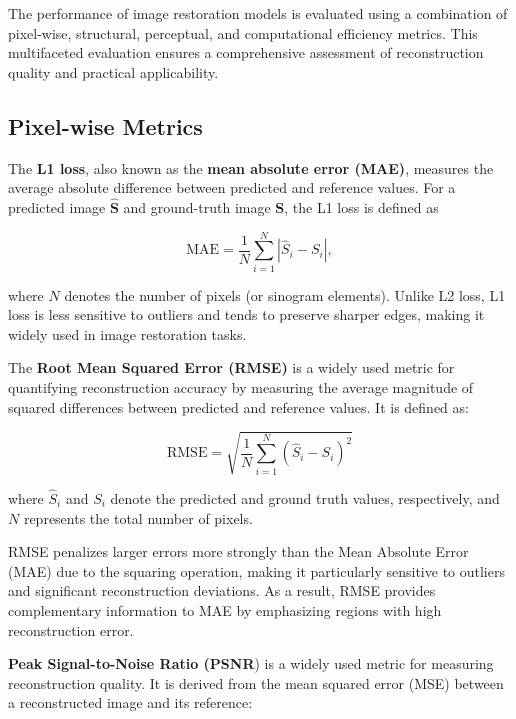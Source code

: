 The performance of image restoration models is evaluated using a combination of pixel-wise, structural, perceptual, and computational efficiency metrics. This multifaceted evaluation ensures a comprehensive assessment of reconstruction quality and practical applicability.

\subsection{Pixel-wise Metrics}

The\textbf{ L1 loss}, also known as the \textbf{mean absolute error (MAE)}, measures the average absolute difference between predicted and reference values. For a predicted image $\hat{\mathbf{S}}$ and ground-truth image $\mathbf{S}$, the L1 loss is defined as

\begin{equation}
\mathrm{MAE} 
= \frac{1}{N} \sum_{i=1}^{N} 
\left| \hat{S}_i - S_i \right|,
\end{equation}

where $N$ denotes the number of pixels (or sinogram elements). Unlike  L2 loss, L1 loss is less sensitive to outliers and tends to preserve sharper edges, making it widely used in image restoration tasks. 



The \textbf{Root Mean Squared Error (RMSE) } is a widely used metric for quantifying reconstruction accuracy by measuring the average magnitude of squared differences between predicted and reference values. It is defined as:

\begin{equation}
\mathrm{RMSE} = \sqrt{\frac{1}{N} \sum_{i=1}^{N} \left(\hat{S}_i - S_i\right)^2}
\end{equation}

where $\hat{S}_i$ and $S_i$ denote the predicted and ground truth values, respectively, and $N$ represents the total number of pixels.

RMSE penalizes larger errors more strongly than the Mean Absolute Error (MAE) due to the squaring operation, making it particularly sensitive to outliers and significant reconstruction deviations. As a result, RMSE provides complementary information to MAE by emphasizing regions with high reconstruction error.



\textbf{Peak Signal-to-Noise Ratio (PSNR}) is a widely used metric for measuring reconstruction quality. It is derived from the mean squared error (MSE) between a reconstructed image and its reference:

